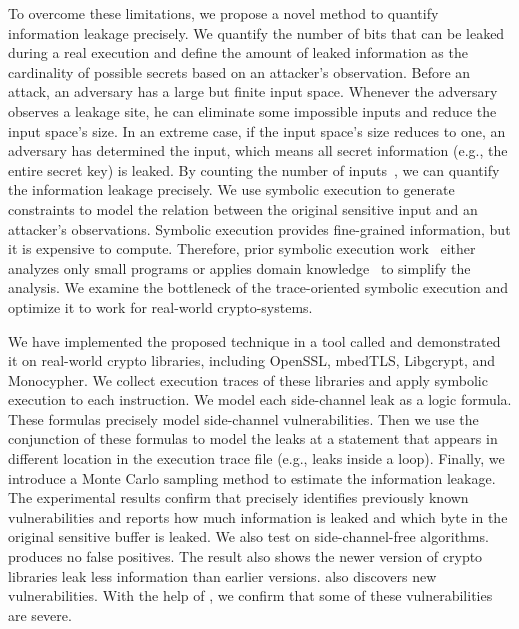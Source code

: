 To overcome these limitations, we propose a novel method to quantify information
leakage precisely. We quantify the number of bits that can be leaked during a real
execution and define the amount of leaked information as the cardinality of
possible secrets based on an attacker's observation. Before an attack, an adversary has a large but finite input space.
Whenever the adversary observes a leakage site, he can eliminate some impossible
inputs and reduce the input space's size. In an extreme case, if the input space's size reduces to one, an adversary has determined the input, which means all secret information (e.g., the entire secret key) is
leaked. By counting the number of inputs~\cite{10.1007/11499107_24}, we can quantify the information leakage precisely.
We use symbolic execution to generate constraints to model the relation
between the original sensitive input and an attacker's observations.
Symbolic execution provides fine-grained information, but it is expensive
to compute. Therefore, prior symbolic
execution work~\cite{203878,236338,Brotzman19Casym} either analyzes only
small programs or applies domain knowledge~\cite{203878} to simplify the analysis. We
examine the bottleneck of the trace-oriented symbolic execution and optimize it
to work for real-world crypto-systems.

We have implemented the proposed technique in a tool called \tool{} and demonstrated
it on real-world crypto libraries, including OpenSSL,
mbedTLS, Libgcrypt, and Monocypher.
We collect execution traces of these libraries and apply
symbolic execution to each instruction. We model
each side-channel leak as a logic formula. These
formulas precisely model side-channel vulnerabilities.
Then we use the conjunction of these formulas to model the
leaks at a statement that appears in different location in
the execution trace file (e.g., leaks inside a loop).
Finally, we introduce a Monte Carlo sampling method to estimate
the information leakage.
The experimental results confirm
that \tool{} precisely identifies previously known vulnerabilities and
reports how much information is leaked and which byte in the original sensitive
buffer is leaked. We also test \tool{} on side-channel-free algorithms.
\tool{} produces no false positives.
The result also shows the newer version of crypto libraries leak less information
than earlier versions.
\tool{} also discovers new vulnerabilities. With the help of \tool{},
we confirm that some of these vulnerabilities are severe.




